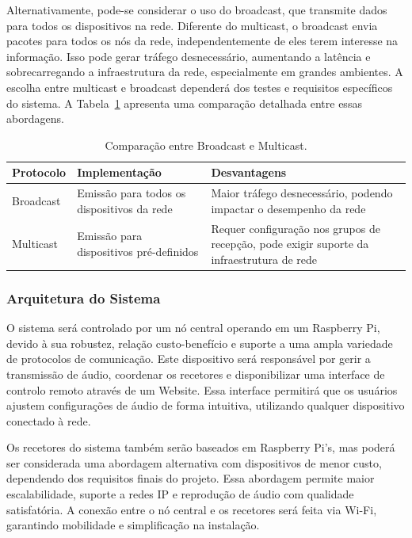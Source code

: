 \documentclass{article}
\begin{document}
Alternativamente, pode-se considerar o uso do broadcast, que transmite dados para todos os dispositivos na rede. Diferente do multicast, o broadcast envia pacotes para todos os nós da rede, independentemente de eles terem interesse na informação. Isso pode gerar tráfego desnecessário, aumentando a latência e sobrecarregando a infraestrutura da rede, especialmente em grandes ambientes. A escolha entre multicast e broadcast dependerá dos testes e requisitos específicos do sistema. A Tabela~\ref{tab:comparacao_multicast_broadcast} apresenta uma comparação detalhada entre essas abordagens.

\begin{table}[h]
    \centering
    \begin{tabular}{@{}l p{5cm} p{5cm}@{}}
        \toprule
        \textbf{Protocolo} & \textbf{Implementação} & \textbf{Desvantagens} \\
        \midrule
        Broadcast & Emissão para todos os dispositivos da rede & Maior tráfego desnecessário, podendo impactar o desempenho da rede \\
        Multicast & Emissão para dispositivos pré-definidos & Requer configuração nos grupos de recepção, pode exigir suporte da infraestrutura de rede \\
        \bottomrule
    \end{tabular}
    \caption{Comparação entre Broadcast e Multicast.}
    \label{tab:comparacao_multicast_broadcast}
\end{table}


\subsubsection{Arquitetura do Sistema} O sistema será controlado por um nó central operando em um Raspberry Pi, devido à sua robustez, relação custo-benefício e suporte a uma ampla variedade de protocolos de comunicação. Este dispositivo será responsável por gerir a transmissão de áudio, coordenar os recetores e disponibilizar uma interface de controlo remoto através de um Website. Essa interface permitirá que os usuários ajustem configurações de áudio de forma intuitiva, utilizando qualquer dispositivo conectado à rede.

Os recetores do sistema também serão baseados em Raspberry Pi's, mas poderá ser considerada uma abordagem alternativa com dispositivos de menor custo, dependendo dos requisitos finais do projeto. Essa abordagem permite maior escalabilidade, suporte a redes IP e reprodução de áudio com qualidade satisfatória. A conexão entre o nó central e os recetores será feita via Wi-Fi, garantindo mobilidade e simplificação na instalação.
\end{document}
